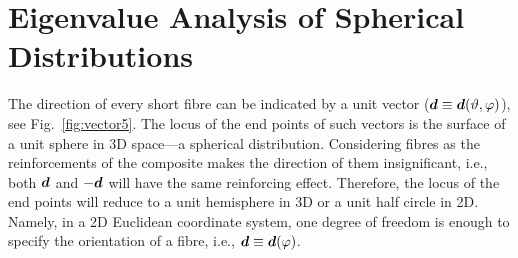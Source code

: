 \section{Eigenvalue Analysis of Spherical Distributions}
	The direction of every short fibre can be indicated by a unit vector ($\tena{d}\equiv\tena{d}(\vartheta,\varphi)$), see Fig.~\ref{fig:vector5}. The locus of the end points of such vectors is the surface of a unit sphere in 3D space---a spherical distribution. Considering fibres as the reinforcements of the composite makes the direction of them insignificant, i.e., both $\tena{d}$ and $-\tena{d}$ will have the same reinforcing effect. Therefore, the locus of the end points will reduce to a unit hemisphere in 3D or a unit half circle in 2D. Namely, in a 2D Euclidean coordinate system, one degree of freedom is enough to specify the orientation of a fibre, i.e., $\tena{d}\equiv\tena{d}(\varphi)$.

